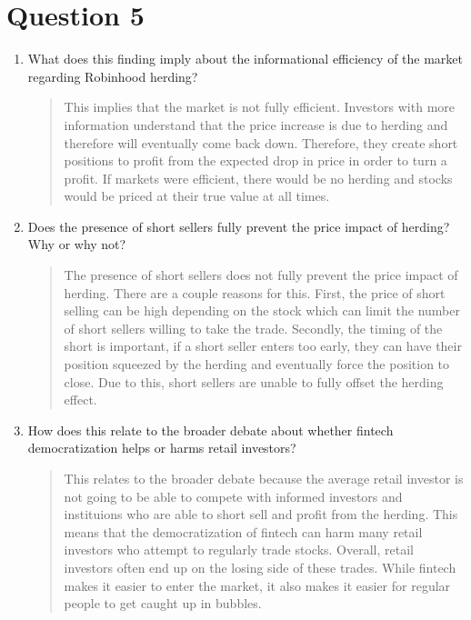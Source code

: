 \documentclass[12pt]{article}
\begin{document}
\section*{Question 5}
\begin{enumerate}
    \item What does this finding imply about the informational efficiency of the market regarding Robinhood herding?

    \begin{quote}
        This implies that the market is not fully efficient. Investors with more information understand that the price increase is due to herding and therefore will eventually come back down.
        Therefore, they create short positions to profit from the expected drop in price in order to turn a profit. If markets were efficient, there would be no herding and stocks would
        be priced at their true value at all times.
    \end{quote}

    \item Does the presence of short sellers fully prevent the price impact of herding? Why or why not?

    \begin{quote}
    The presence of short sellers does not fully prevent the price impact of herding. There are a couple reasons for this.
    First, the price of short selling can be high depending on the stock which can limit the number of short sellers willing to take the trade.
    Secondly, the timing of the short is important, if a short seller enters too early, they can have their position squeezed by the herding and
    eventually force the position to close. Due to this, short sellers are unable to fully offset the herding effect.
    \end{quote}

    \item How does this relate to the broader debate about whether fintech democratization helps or harms retail investors?

    \begin{quote}
     This relates to the broader debate because the average retail investor is not going to be able to compete with informed investors and instituions who are able to short sell and 
     profit from the herding. This means that the democratization of fintech can harm many retail investors who attempt to regularly trade stocks. Overall, retail investors often end up
      on the losing side of these trades. While fintech makes it easier to enter the market, it also makes it easier for regular people to get caught up in bubbles. 
    \end{quote}

\end{enumerate}
\end{document}
